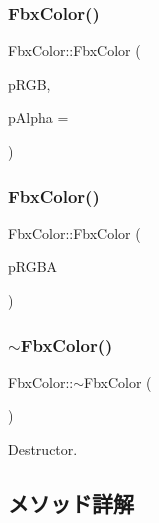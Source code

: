 \subsubsection{\texorpdfstring{Fbx\+Color()}{FbxColor()}\hspace{0.1cm}{\footnotesize\ttfamily [3/4]}}
{\footnotesize\ttfamily Fbx\+Color\+::\+Fbx\+Color (\begin{DoxyParamCaption}\item[{const \hyperlink{fbxtypes_8h_ae0a96f14cde566774c7553aa7523b7a7}{Fbx\+Double3} \&}]{p\+R\+GB,  }\item[{const double}]{p\+Alpha = {} }\end{DoxyParamCaption})}

\mbox{\label{class_fbx_color_a845eb670fb29e7a942973c4281c4939e}} 
\subsubsection{\texorpdfstring{Fbx\+Color()}{FbxColor()}\hspace{0.1cm}{\footnotesize\ttfamily [4/4]}}
{\footnotesize\ttfamily Fbx\+Color\+::\+Fbx\+Color (\begin{DoxyParamCaption}\item[{const \hyperlink{fbxtypes_8h_a03dddc7979e0016f74a095b1943d97a3}{Fbx\+Double4} \&}]{p\+R\+G\+BA }\end{DoxyParamCaption})}

\mbox{\label{class_fbx_color_a5b8800e1233bdc6eb44add9be6cab9df}} 
\subsubsection{\texorpdfstring{$\sim$\+Fbx\+Color()}{~FbxColor()}}
{\footnotesize\ttfamily Fbx\+Color\+::$\sim$\+Fbx\+Color (\begin{DoxyParamCaption}{ }\end{DoxyParamCaption})}



Destructor. 



\subsection{メソッド詳解}
\mbox{\label{class_fbx_color_a12d5438931a4401d632612dc3564c433}} 
